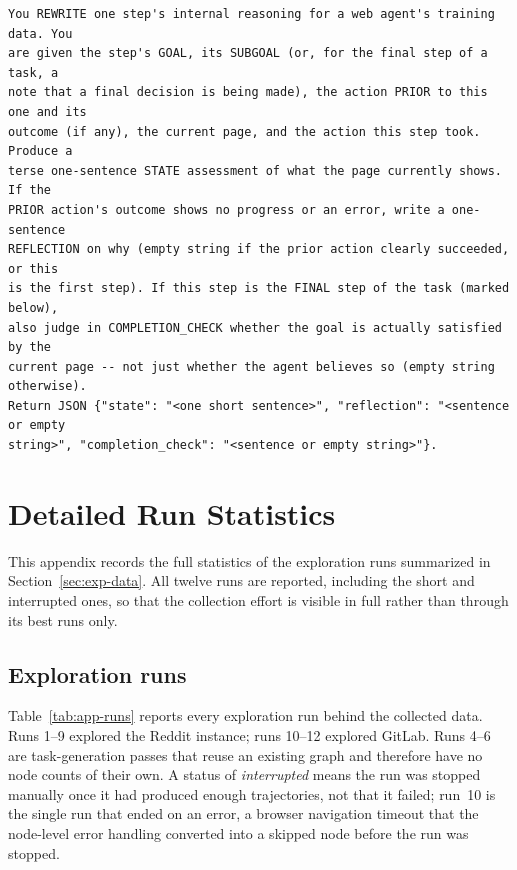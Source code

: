 \begin{lstlisting}[style=mystyle,numbers=none,basicstyle=\scriptsize\ttfamily]
You REWRITE one step's internal reasoning for a web agent's training data. You
are given the step's GOAL, its SUBGOAL (or, for the final step of a task, a
note that a final decision is being made), the action PRIOR to this one and its
outcome (if any), the current page, and the action this step took. Produce a
terse one-sentence STATE assessment of what the page currently shows. If the
PRIOR action's outcome shows no progress or an error, write a one-sentence
REFLECTION on why (empty string if the prior action clearly succeeded, or this
is the first step). If this step is the FINAL step of the task (marked below),
also judge in COMPLETION_CHECK whether the goal is actually satisfied by the
current page -- not just whether the agent believes so (empty string
otherwise).
Return JSON {"state": "<one short sentence>", "reflection": "<sentence or empty
string>", "completion_check": "<sentence or empty string>"}.
\end{lstlisting}

\chapter{Detailed Run Statistics}
\label{app:runs}

This appendix records the full statistics of the exploration runs summarized in
Section~\ref{sec:exp-data}. All twelve runs are reported, including the short
and interrupted ones, so that the collection effort is visible in full rather
than through its best runs only.

\section{Exploration runs}
\label{app:runs-explore}

Table~\ref{tab:app-runs} reports every exploration run behind the collected
data. Runs 1--9 explored the Reddit instance; runs 10--12 explored GitLab. Runs 4--6
are task-generation passes that reuse an existing graph and therefore have no
node counts of their own. A status of \emph{interrupted} means the run was
stopped manually once it had produced enough trajectories, not that it failed;
run~10 is the single run that ended on an error, a browser navigation timeout
that the node-level error handling converted into a skipped node before the
run was stopped.

